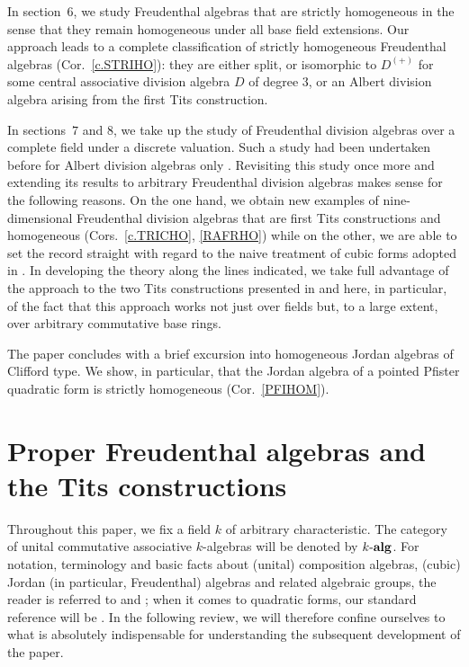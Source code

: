 \documentclass{amsart}
\theoremstyle{definition} %
\theoremstyle{remark} %
\newcommand{\alg}[1]{{#1\text{-\textbf{alg}}}}
\newcommand{\kalg}{\alg{k}}
\renewcommand{\:}{\colon\,}
\numberwithin{equation}{section}
\begin{document}
In section~$6$, we study Freudenthal algebras that are strictly homogeneous in the sense that they remain homogeneous under all base field extensions. Our approach leads to a complete classification of strictly homogeneous Freudenthal algebras (Cor.~\ref{c.STRIHO}): they are either split, or isomorphic to $D^{(+)}$ for some central associative division algebra $D$ of degree $3$, or an Albert division algebra arising from the first Tits construction.

In sections~$7$ and $8$, we take up the study of Freudenthal division algebras over a complete field under a discrete valuation. Such a study had been undertaken before for Albert division algebras only \cite{MR0379620}. Revisiting this study once more and extending its results to arbitrary Freudenthal division algebras makes sense for the following reasons. On the one hand, we obtain new examples of nine-dimensional Freudenthal division algebras that are first Tits constructions and homogeneous (Cors.~\ref{c.TRICHO}, \ref{RAFRHO}) while on the other, we are able to set the record straight with regard to the naive treatment of cubic forms adopted in \cite{MR0379620}. In developing the theory along the lines indicated, we take full advantage of the approach to the two Tits constructions presented in \cite[Chap.~VII]{MR4806163} and here, in particular, of the fact that this approach works not just over fields but, to a large extent, over arbitrary commutative base rings.

The paper concludes with a brief excursion into homogeneous Jordan algebras of Clifford type. We show, in particular, that the Jordan algebra of a pointed Pfister quadratic form is strictly homogeneous (Cor.~\ref{PFIHOM}).

\section{Proper Freudenthal algebras and the Tits constructions} \label{s.REDFRA} 
Throughout this paper, we fix a field $k$ of arbitrary characteristic. The category of unital commutative associative $k$-algebras will be denoted by $\kalg$. For notation, terminology and basic facts about (unital) composition algebras, (cubic) Jordan (in particular, Freudenthal) algebras and related algebraic groups, the reader is referred to \cite{MR4806163} and \cite{MR1632779}; when it comes to quadratic forms, our standard reference will be \cite{MR2427530}. In the following review, we will therefore confine ourselves to what is absolutely indispensable for understanding the subsequent development of the paper.
\end{document}
